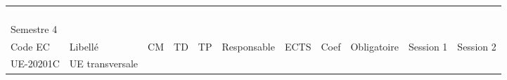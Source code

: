 \documentclass[a4paper,11pt]{article}
\begin{document}
{{\begin{tabular}{lllllllllll}
                               &                                                    &                           &                           &                           &                                    &                             &                             &                                    &                                  &                                  \\
                               &                                                    &                           &                           &                           &                                    &                             &                             &                                    &                                  &                                  \\
                               &                                                    &                           &                           &                           &                                    &                             &                             &                                    &                                  &                                  \\
                               &                                                    &                           &                           &                           &                                    &                             &                             &                                    &                                  &                                  \\
\rowcolor[HTML]{656565} 
Semestre 4                     &                                                    &                           &                           &                           &                                    &                             &                             &                                    &                                  &                                  \\
\rowcolor[HTML]{9B9B9B} 
Code EC                        & Libellé                                            & CM                        & TD                        & TP                        & Responsable                        & ECTS                        & Coef                        & Obligatoire                        & Session 1                        & Session 2                        \\
\rowcolor[HTML]{C0C0C0} 
UE-20201C                      & UE transversale                                    &                           &                           &                           &                                    &                             &                             &                                    &                                  &                                  \\

\end{tabular}}}
\end{document}
